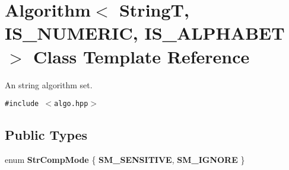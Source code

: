\hypertarget{classAlgorithm}{
\section{Algorithm$<$ StringT, IS\_\-NUMERIC, IS\_\-ALPHABET $>$ Class Template Reference}
\label{classAlgorithm}
}
An string algorithm set.  


{\tt \#include $<$algo.hpp$>$}

\subsection*{Public Types}
\begin{CompactItemize}
\item 
enum \textbf{StrCompMode} \{ \textbf{SM\_\-SENSITIVE}, 
\textbf{SM\_\-IGNORE}
 \}
\end{CompactItemize}
